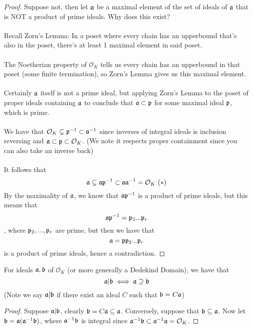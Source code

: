 \begin{proof}
Suppose not, then let $\mathfrak{a}$ be a maximal element of the set of ideals of $\mathfrak{a}$ that is NOT a product of prime ideals. Why does this exist?\\\\
Recall Zorn's Lemma: In a poset where every chain has an upperbound that's also in the poset, there's at least 1 maximal element in said poset.\\\\
The Noetherian property of $\mathcal{O}_K$ tells us every chain has an upperbound in that poset (some finite termination), so Zorn's Lemma gives us this maximal element.\\\\
Certainly $\mathfrak{a}$ itself is not a prime ideal, but applying Zorn's Lemma to the poset of proper ideals containing $\mathfrak{a}$ to conclude that $\mathfrak{a} \subset \mathfrak{p}$ for some maximal ideal $\mathfrak{p}$, which is prime.\\\\
We have that $\mathcal{O}_K \subsetneq \mathfrak{p}^{-1} \subset \mathfrak{a}^{-1}$ since inverses of integral ideals is inclusion reversing and $\mathfrak{a} \subset \mathfrak{p} \subset \mathcal{O}_K$. (We note it respects proper containment since you can also take an inverse back)\\\\
It follows that 
\[\mathfrak{a} \subsetneq \mathfrak{a} \mathfrak{p}^{-1} \subset \mathfrak{a} \mathfrak{a}^{-1} = \mathcal{O}_K\ (*)\]
By the maximality of $\mathfrak{a}$, we know that $\mathfrak{a} \mathfrak{p}^{-1}$ is a product of prime ideals, but this means that
\[\mathfrak{a} \mathfrak{p}^{-1} = \mathfrak{p}_2 ... \mathfrak{p}_r\]
, where $\mathfrak{p}_2, ..., \mathfrak{p}_r$ are prime, but then we have that
\[\mathfrak{a} = \mathfrak{p} \mathfrak{p}_2 ... \mathfrak{p}_r\]
is a product of prime ideals, hence a contradiction.
\end{proof}

\begin{lemma}[pg. 113 S+T]
For ideals $\mathfrak{a}, \mathfrak{b}$ of $\mathcal{O}_K$ (or more generally a Dedekind Domain), we have that 
\[\mathfrak{a} | \mathfrak{b} \iff \mathfrak{a} \supseteq \mathfrak{b}\]
(Note we say $\mathfrak{a} | \mathfrak{b}$ if there exist an ideal $C$ such that $\mathfrak{b} = C \mathfrak{a}$)
\end{lemma}

\begin{proof}
Suppose $\mathfrak{a} | \mathfrak{b}$, clearly $\mathfrak{b} = C \mathfrak{a} \subseteq \mathfrak{a}$. Conversely, suppose that $\mathfrak{b} \subseteq \mathfrak{a}$. Now let $\mathfrak{b} = \mathfrak{a}(\mathfrak{a}^{-1} \mathfrak{b})$, where $\mathfrak{a}^{-1} \mathfrak{b}$ is integral since $\mathfrak{a}^{-1} \mathfrak{b} \subset \mathfrak{a}^{-1} \mathfrak{a} = \mathcal{O}_K$.
\end{proof}

